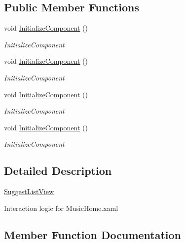 \subsection*{Public Member Functions}
\begin{DoxyCompactItemize}
\item 
void \hyperlink{class_presentation_1_1_view_1_1_list_1_1_suggest_list_view_a0d6458960ea2444bee0d02317d0f2baa}{Initialize\+Component} ()
\begin{DoxyCompactList}\small\item\em Initialize\+Component \end{DoxyCompactList}\item 
void \hyperlink{class_presentation_1_1_view_1_1_list_1_1_suggest_list_view_a0d6458960ea2444bee0d02317d0f2baa}{Initialize\+Component} ()
\begin{DoxyCompactList}\small\item\em Initialize\+Component \end{DoxyCompactList}\item 
void \hyperlink{class_presentation_1_1_view_1_1_list_1_1_suggest_list_view_a0d6458960ea2444bee0d02317d0f2baa}{Initialize\+Component} ()
\begin{DoxyCompactList}\small\item\em Initialize\+Component \end{DoxyCompactList}\item 
void \hyperlink{class_presentation_1_1_view_1_1_list_1_1_suggest_list_view_a0d6458960ea2444bee0d02317d0f2baa}{Initialize\+Component} ()
\begin{DoxyCompactList}\small\item\em Initialize\+Component \end{DoxyCompactList}\end{DoxyCompactItemize}


\subsection{Detailed Description}
\hyperlink{class_presentation_1_1_view_1_1_list_1_1_suggest_list_view}{Suggest\+List\+View} 

Interaction logic for Music\+Home.\+xaml 

\subsection{Member Function Documentation}
\mbox{\label{class_presentation_1_1_view_1_1_list_1_1_suggest_list_view_a0d6458960ea2444bee0d02317d0f2baa}} 
